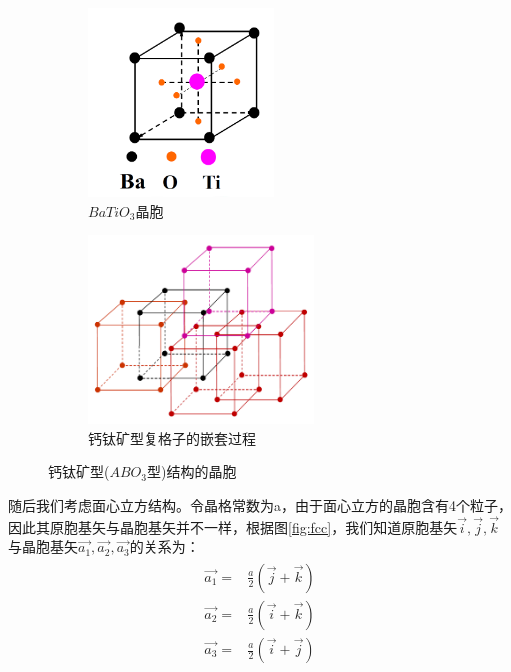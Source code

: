 \documentclass{ctexart}
\begin{document}
    
        \begin{figure}[H]
        \begin{subfigure}{0.5\textwidth}
        \includegraphics[width=0.9\linewidth, height=5cm]{figure/sc_ABO3_1.png} 
        \caption{$BaTiO_3$晶胞}
        \label{fig:sub_ABO3_1}
        \end{subfigure}
        \begin{subfigure}{0.5\textwidth}
        \includegraphics[width=0.9\linewidth, height=5cm]{figure/sc_ABO3_2.png}
        \caption{钙钛矿型复格子的嵌套过程}
        \label{fig:sub_ABO3_2}
        \end{subfigure}
        
        \caption{钙钛矿型($ABO_3$型)结构的晶胞}
        \label{fig:ABO3}
        \end{figure}
    
    随后我们考虑面心立方结构。令晶格常数为a，由于面心立方的晶胞含有4个粒子，因此其原胞基矢与晶胞基矢并不一样，根据图\ref{fig:fcc}，我们知道原胞基矢$\Vec{i},\Vec{j},\Vec{k}$与晶胞基矢$\Vec{a_1},\Vec{a_2},\Vec{a_3}$的关系为：
    \begin{align}
        \begin{split}
            \Vec{a_1}=&\frac{a}{2}(\Vec{j}+\Vec{k})\\
            \Vec{a_2}=&\frac{a}{2}(\Vec{i}+\Vec{k})\\
            \Vec{a_3}=&\frac{a}{2}(\Vec{i}+\Vec{j})
        \end{split}
    \end{align}
    
\end{document}
